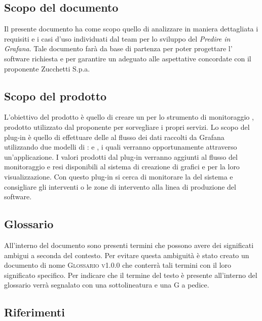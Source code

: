 \documentclass[../analisi-dei-requisiti.tex]{subfiles}
\begin{document}
\subsection{Scopo del documento}%
\label{subs:scopo_del_documento}
Il presente documento ha come scopo quello di analizzare in maniera dettagliata i requisiti e i casi d'uso individuati dal team per lo sviluppo del  \emph{Predire in Grafana}. Tale documento farà da base di partenza per poter progettare l' software richiesta e per garantire un  adeguato alle aspettative concordate con il proponente Zucchetti S.p.a.

\subsection{Scopo del prodotto}%
\label{subs:scopo_del_prodotto}
L'obiettivo del prodotto è quello di creare un  per lo strumento di monitoraggio , prodotto utilizzato dal proponente per sorvegliare i propri servizi. Lo scopo del plug-in è quello di effettuare delle  al flusso dei dati raccolti da Grafana utilizzando due modelli di :  e , i quali verranno opportunamente  attraverso un'applicazione. I valori prodotti dal plug-in verranno aggiunti al flusso del monitoraggio e resi disponibili al sistema di creazione di grafici e  per la loro visualizzazione. Con questo plug-in si cerca di monitorare la  del sistema e consigliare gli interventi o le zone di intervento alla linea di produzione del software.

\subsection{Glossario}
\label{subs:glossario}
All'interno del documento sono presenti termini che possono avere dei significati ambigui a seconda del contesto. Per evitare questa ambiguità è stato creato un documento di nome \textsc{Glossario v1.0.0} che conterrà tali termini con il loro significato specifico. Per indicare che il termine del testo è presente all'interno del glossario verrà segnalato con una sottolineatura e una G a pedice.

\subsection{Riferimenti}
\label{subs:riferimenti}
\end{document}
